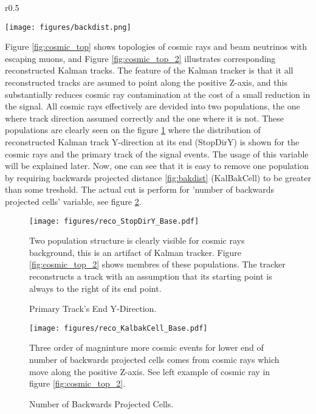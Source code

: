 \begin{wrapfigure}{r}{0.5\textwidth}
\vspace{-15pt}
  \begin{center}
    \texttt{[image: figures/backdist.png]}
  \end{center}
\vspace{0.5mm}
\caption{Backwards projected distance}
\label{fig:bakdist}
\end{wrapfigure}
Figure \ref{fig:cosmic_top} shows topologies of cosmic rays and beam neutrinos with escaping muons, and Figure
\ref{fig:cosmic_top_2} illustrates corresponding reconstructed Kalman tracks. The feature of the Kalman 
tracker is that it all reconstructed tracks are asumed to point along the positive Z-axis, and this substantially 
reduces cosmic ray contamination at the cost of a small reduction in the signal. All cosmic 
rays effectively are devided into two populations, the one where track direction assumed correctly and the 
one where it is not. These populations are clearly seen on the figure \ref{fig:stopdiry_1} where the distribution
of reconstructed Kalman track Y-direction at its end (StopDirY) is shown for the cosmic rays and the primary 
track of the signal events. The usage of this variable will be explained later. Now, one can see that it 
is easy to remove one population by requiring backwards projected distance \ref{fig:bakdist} (KalBakCell) to 
be greater than some treshold. The actual cut is perform for 'number of backwards projected cells' variable, 
see figure \ref{fig:kalbakcell}.
\begin{figure}[h]
\centering
\texttt{[image: figures/reco\_StopDirY\_Base.pdf]}
\caption{Primary Track's End Y-Direction.}
{Two population structure is clearly visible for cosmic rays background, this is an artifact of Kalman tracker.
Figure \ref{fig:cosmic_top_2} shows membres of these populations. The tracker reconstructs a track with an assumption 
that its starting point is always to the right of its end point. }
\label{fig:stopdiry_1}
\end{figure}
\begin{figure}[h]
\centering
\texttt{[image: figures/reco\_KalbakCell\_Base.pdf]}
\caption{Number of Backwards Projected Cells.}
{Three order of magninture more cosmic events for lower end of number of backwards projected cells comes from cosmic 
rays which move along the positive Z-axis. See left example of cosmic ray in figure \ref{fig:cosmic_top_2}. }
\label{fig:kalbakcell}
\end{figure}

